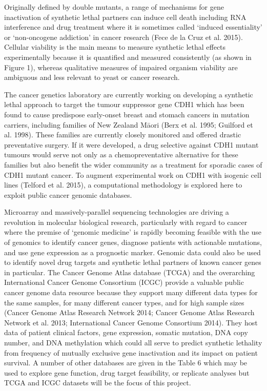 Originally defined by double mutants, a range of mechanisms for gene inactivation of synthetic lethal partners can induce cell death including RNA interference and drug treatment where it is sometimes called ‘induced essentiality’ or ‘non-oncogene addiction’ in cancer research (Fece de la Cruz et al. 2015).  Cellular viability is the main means to measure synthetic lethal effects experimentally because it is quantified and measured consistently (as shown in Figure 1), whereas qualitative measures of impaired organism viability are ambiguous and less relevant to yeast or cancer research.

The cancer genetics laboratory are currently working on developing a synthetic lethal approach to target the tumour suppressor gene CDH1 which has been found to cause predispose early-onset breast and stomach cancers in mutation carriers, including families of New Zealand M\={a}ori (Berx et al. 1995; Guilford et al. 1998).  These families are currently closely monitored and offered drastic preventative surgery.  If it were developed, a drug selective against CDH1 mutant tumours would serve not only as a chemopreventative alternative for these families but also benefit the wider community as a treatment for sporadic cases of CDH1 mutant cancer.  To augment experimental work on CDH1 with isogenic cell lines (Telford et al. 2015), a computational methodology is explored here to exploit public cancer genomic databases.

Microarray and massively-parallel sequencing technologies are driving a revolution in molecular biological research, particularly with regard to cancer where the premise of ‘genomic medicine’ is rapidly becoming feasible with the use of genomics to identify cancer genes, diagnose patients with actionable mutations, and use gene expression as a prognostic marker.  Genomic data could also be used to identify novel drug targets and synthetic lethal partners of known cancer genes in particular.  The Cancer Genome Atlas database (TCGA) and the overarching International Cancer Genome Consortium (ICGC) provide a valuable public cancer genome data resource because they support many different data types for the same samples, for many different cancer types, and for high sample sizes (Cancer Genome Atlas Research Network 2014; Cancer Genome Atlas Research Network et al. 2013; International Cancer Genome Consortium 2014).  They host data of patient clinical factors, gene expression, somatic mutation, DNA copy number, and DNA methylation which could all serve to predict synthetic lethality from frequency of mutually exclusive gene inactivation and its impact on patient survival.  A number of other databases are given in the Table 6 which may be used to explore gene function, drug target feasibility, or replicate analyses but TCGA and ICGC datasets will be the focus of this project.

